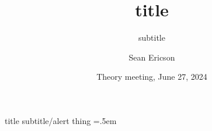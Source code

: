 \documentclass[xcolor={dvipsnames}]{beamer}
\title{title}
\subtitle{subtitle}
\author{Sean Ericson}
\institute{UO}
\date{Theory meeting, June 27, 2024}
\let\olditemize=\itemize
\let\endolditemize=\enditemize
\renewenvironment{itemize}{\olditemize \itemsep=.5em }{\endolditemize}
\begin{document}
\frame{\titlepage}

\begin{frame}{title}
    \alert{subtitle/alert thing}
    \begin{itemize}
        \item<2->
    \end{itemize}
\end{frame}

%     
%     
\end{document}
